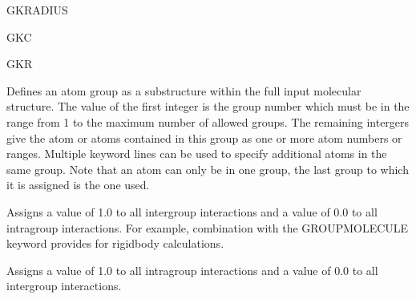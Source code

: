 \documentclass[letterpaper,11pt,english]{sphinxmanual}
\begin{document}
\ignorespaces {}\label{\detokenize{text/keywords:key-gk-radius}}
\sphinxAtStartPar
GK\sphinxhyphen{}RADIUS

\ignorespaces {}\label{\detokenize{text/keywords:key-gkc}}
\sphinxAtStartPar
GKC

\ignorespaces {}\label{\detokenize{text/keywords:key-gkr}}
\sphinxAtStartPar
GKR

\ignorespaces {}\label{\detokenize{text/keywords:key-group}}\begin{description}
\sphinxAtStartPar
Defines an atom group as a substructure within the full input molecular structure. The value of the first integer is the group number which must be in the range from 1 to the maximum number of allowed groups. The remaining intergers give the atom or atoms contained in this group as one or more atom numbers or ranges. Multiple keyword lines can be used to specify additional atoms in the same group. Note that an atom can only be in one group, the last group to which it is assigned is the one used.

\end{description}

\ignorespaces {}\label{\detokenize{text/keywords:key-group-inter}}\begin{description}
\sphinxAtStartPar
Assigns a value of 1.0 to all inter\sphinxhyphen{}group interactions and a value of 0.0 to all intra\sphinxhyphen{}group interactions. For example, combination with the GROUP\sphinxhyphen{}MOLECULE keyword provides for rigid\sphinxhyphen{}body calculations.

\end{description}

\ignorespaces {}\label{\detokenize{text/keywords:key-group-intra}}\begin{description}
\sphinxAtStartPar
Assigns a value of 1.0 to all intra\sphinxhyphen{}group interactions and a value of 0.0 to all inter\sphinxhyphen{}group interactions.

\end{description}
\end{document}
